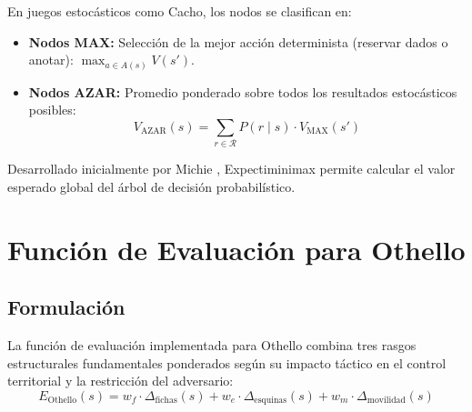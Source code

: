 \documentclass[10pt, a4paper]{article}
\begin{document}
En juegos estocásticos como Cacho, los nodos se clasifican en:
\begin{itemize}
    \item \textbf{Nodos MAX:} Selección de la mejor acción determinista (reservar dados o anotar): $\max_{a \in A(s)} V(s')$.
    \item \textbf{Nodos AZAR:} Promedio ponderado sobre todos los resultados estocásticos posibles:
    \begin{equation}
    V_{\text{AZAR}}(s) = \sum_{r \in \mathcal{R}} P(r \mid s) \cdot V_{\text{MAX}}(s')
    \label{eq:expectiminimax}
    \end{equation}
\end{itemize}
Desarrollado inicialmente por Michie \cite{michie1966expectiminimax}, Expectiminimax permite calcular el valor esperado global del árbol de decisión probabilístico.

\section{Función de Evaluación para Othello}

\subsection{Formulación}
La función de evaluación implementada para Othello combina tres rasgos estructurales fundamentales ponderados según su impacto táctico en el control territorial y la restricción del adversario:
\begin{equation}
E_{\text{Othello}}(s) = w_f \cdot \Delta_{\text{fichas}}(s) + w_e \cdot \Delta_{\text{esquinas}}(s) + w_m \cdot \Delta_{\text{movilidad}}(s)
\label{eq:othello_func}
\end{equation}
\end{document}
